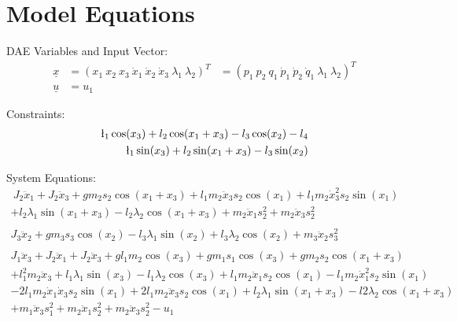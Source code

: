 \documentclass[10pt,a4paper]{article}
\begin{document}
	
	\begin{tabular}{ll}

	\end{tabular}
	
	
	\section{Model Equations} %
	
	DAE Variables and Input Vector:
	\begin{align*}
		\underline{x} &= (x_1 \ x_2 \ x_3 \ \dot{x}_1 \ \dot{x}_2 \ \dot{x}_3 \ \lambda_1 \ \lambda_2)^T &= (p_1 \ p_2 \ q_1 \ \dot{p}_1 \ \dot{p}_2 \ \dot{q}_1 \ \lambda_1 \ \lambda_2)^T \\
		\underline{u} &= u_1
	\end{align*}
	
	\noindent Constraints:			
	\begin{subequations}
	\begin{align}
		\l_1\cos(x_3) + l_2\cos(x_1 + x_3) - l_3\cos(x_2) - l_4 \\
		\l_1\sin(x_3) + l_2\sin(x_1 + x_3) - l_3\sin(x_2)
	\end{align}
	\end{subequations}
	
	\noindent System Equations:			
	\begin{subequations}
	\begin{align*}
	\ J_2\ddot{x}_1 + J_2\ddot{x}_3 + g m_2 s_2\cos(x_1 + x_3) + l_1 m_2 \ddot{x}_3 s_2 \cos(x_1) + l_1 m_2 \dot{x}_3^2 s_2 \sin(x_1) \\
	+ l_2 \lambda_1 \sin(x_1 + x_3) - l_2 \lambda_2 \cos(x_1 + x_3) + m_2 \ddot{x}_1 s_2^2 + m_2 \ddot{x}_3 s_2^2 \\ 
	\\
	J_3 \ddot{x}_2 + g m_3 s_3 \cos(x_2) - l_3 \lambda_1 \sin(x_2) + l_3 \lambda_2 \cos(x_2) + m_3 \ddot{x}_2 s_3^2 \\
	\\
	J_1 \ddot{x}_3 + J_2 \ddot{x}_1 + J_2 \ddot{x}_3 + g l_1 m_2 \cos(x_3) + g m_1 s_1 \cos(x_3) + g m_2 s_2 \cos(x_1 + x_3) \\
	+ l_1^2 m_2 \ddot{x}_3 + l_1 \lambda_1 \sin(x_3) - l_1 \lambda_2 \cos(x_3) + l_1 m_2 \ddot{x}_1 s_2 \cos(x_1)- l_1 m_2 \dot{x}_1^2 s_2 \sin(x_1) \\
	- 2 l_1 m_2 \dot{x}_1 \dot{x}_3 s_2 \sin(x_1) + 2 l_1 m_2 \ddot{x}_3 s_2 \cos(x_1)+ l_2 \lambda_1 \sin(x_1 + x_3) - l2 \lambda_2 \cos(x_1 + x_3) \\
	+ m_1 \ddot{x}_3 s_1^2 + m_2 \ddot{x}_1 s_2^2 + m_2 \ddot{x}_3 s_2^2 - u_1 \\
	\end{align*}       
	\end{subequations}
\end{document}
